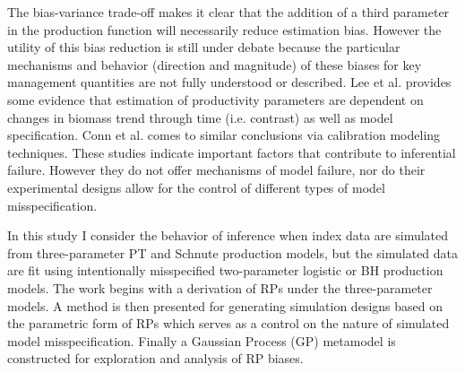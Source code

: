 \documentclass[12pt]{ucscthesis}
\begin{document}
{%
The bias-variance trade-off \cite{ramasubramanian_machine_2017} makes it
clear that the addition of a third parameter in the production function will
necessarily reduce estimation bias. However the utility of this bias reduction
is still under debate because the particular mechanisms and behavior (direction and magnitude) %
of these biases for key management quantities %
are not fully understood or described. Lee et al. \cite{lee_can_2012} provides some
evidence that estimation of productivity parameters %
are dependent on changes in biomass trend through time (i.e. contrast) as well %
as model specification. Conn et al. \cite{conn_when_2010} comes to similar conclusions %
via calibration modeling techniques. These studies indicate important factors that
contribute to inferential failure. However they do not offer mechanisms of model
failure, nor do their experimental designs allow for the control of different
types of model misspecification.





In this study I consider the behavior of inference when index data are simulated
from three-parameter PT and Schnute production models, but the simulated data are fit
using intentionally misspecified two-parameter logistic or BH production models.
%
The work begins with a derivation of RPs under the three-parameter models. %
A method is then presented for generating simulation designs based on the parametric
form of RPs which serves as a control on the nature of simulated model misspecification.
Finally a Gaussian Process (GP) metamodel \cite{gramacy_surrogates_2020}
is constructed for exploration and analysis of RP biases.

}
\end{document}
